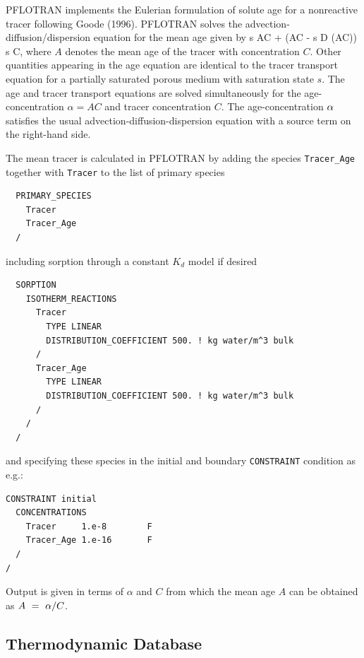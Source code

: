 \documentclass[12pt]{article}
\begin{document}
PFLOTRAN implements the Eulerian formulation of solute age for a nonreactive tracer following Goode (1996). PFLOTRAN solves the advection-diffusion/dispersion equation for the mean age given by
\EQ
{} \varphi s AC + \bnabla\cdot\Big(\bq AC - \varphi s D \bnabla (AC)\Big) \eq \varphi s C,
\EN
where $A$ denotes the mean age of the tracer with concentration $C$. Other quantities appearing in the age equation are identical to the tracer transport equation for a partially saturated porous medium with saturation state $s$. The age and tracer transport equations are solved simultaneously for the age-concentration $\alpha = A C$ and tracer concentration $C$. The age-concentration ${\alpha}$ satisfies the usual advection-diffusion-dispersion equation with a source term on the right-hand side.

The mean tracer is calculated in PFLOTRAN by adding the species {\tt Tracer\_Age} together with {\tt Tracer} to the list of primary species
\begin{verbatim}
  PRIMARY_SPECIES
    Tracer
    Tracer_Age
  /
\end{verbatim}
including sorption through a constant $K_d$ model if desired
\begin{verbatim}
  SORPTION
    ISOTHERM_REACTIONS
      Tracer
        TYPE LINEAR 
        DISTRIBUTION_COEFFICIENT 500. ! kg water/m^3 bulk
      /
      Tracer_Age
        TYPE LINEAR 
        DISTRIBUTION_COEFFICIENT 500. ! kg water/m^3 bulk
      /
    /
  /
\end{verbatim}
and specifying these species in the initial and boundary {\tt CONSTRAINT} condition as e.g.:
\begin{verbatim}
CONSTRAINT initial
  CONCENTRATIONS
    Tracer     1.e-8        F
    Tracer_Age 1.e-16       F
  /
/
\end{verbatim}
Output is given in terms of $\alpha$ and $C$ from which the mean age $A$ can be obtained as $A\ =\ \alpha/C$. 

\subsection{Thermodynamic Database}
\end{document}
